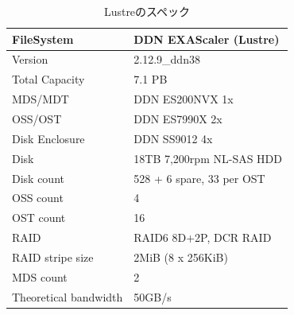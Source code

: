 \documentclass[submit,techrep,noauthor]{ipsj}
\begin{document}
\begin{table}[t]
	\caption{Lustreのスペック}
	\label{tab:lustre}
	\centering
	
	\begin{tabularx}{\linewidth}{Y|Y}
		\hline \hline
		FileSystem            & DDN EXAScaler (Lustre)    \\ \hline
		Version               & 2.12.9\_ddn38             \\ \hline
		Total Capacity        & 7.1 PB                    \\ \hline
		MDS/MDT               & DDN ES200NVX 1x           \\ \hline
		OSS/OST               & DDN ES7990X 2x            \\ \hline
		Disk Enclosure        & DDN SS9012 4x             \\ \hline
		Disk                  & 18TB 7,200rpm NL-SAS HDD  \\ \hline
		Disk count            & 528 + 6 spare, 33 per OST \\ \hline 
		OSS count             & 4                         \\ \hline
		OST count             & 16                        \\ \hline
		RAID                  & RAID6 8D+2P, DCR RAID     \\ \hline
		RAID stripe size      & 2MiB (8 x 256KiB)         \\ \hline
		MDS count             & 2                         \\ \hline
		Theoretical bandwidth & 50GB/s                    \\ \hline
	\end{tabularx}
\end{table}
\end{document}
